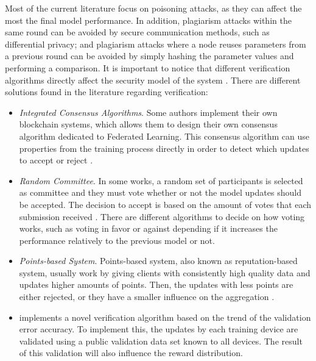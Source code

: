 Most of the current literature focus on poisoning attacks, as they can affect the most the final model performance. In addition, plagiarism attacks within the same round can be avoided by secure communication methods, such as differential privacy; and plagiarism attacks where a node reuses parameters from a previous round can be avoided by simply hashing the parameter values and performing a comparison. It is important to notice that different verification algorithms directly affect the security model of the system \cite{10.48550/arxiv.2110.02182}. There are different solutions found in the literature regarding verification:

\begin{itemize}
    \item \textit{Integrated Consensus Algorithms}. Some authors implement their own blockchain systems, which allows them to design their own consensus algorithm dedicated to Federated Learning. This consensus algorithm can use properties from the training process directly in order to detect which updates to accept or reject \cite{9293091, 10.1007/978-981-15-9213-3_12}.
    
    \item \textit{Random Committee}. In some works, a random set of participants is selected as committee and they must vote whether or not the model updates should be accepted. The decision to accept is based on the amount of votes that each submission received \cite{9159643}. There are different algorithms to decide on how voting works, such as voting in favor or against depending if it increases the performance relatively to the previous model or not.
    
    \item \textit{Points-based System}. Points-based system, also known as reputation-based system, usually work by giving clients with consistently high quality data and updates higher amounts of points. Then, the updates with less points are either rejected, or they have a smaller influence on the aggregation  \cite{10.48550/arxiv.2011.07516, 9170559, Peyvandi2022, 9292450}.
    
    \item \cite{8945913} implements a novel verification algorithm based on the trend of the validation error accuracy. To implement this, the updates by each training device are validated using a public validation data set known to all devices. The result of this validation will also influence the reward distribution.

\end{itemize}

